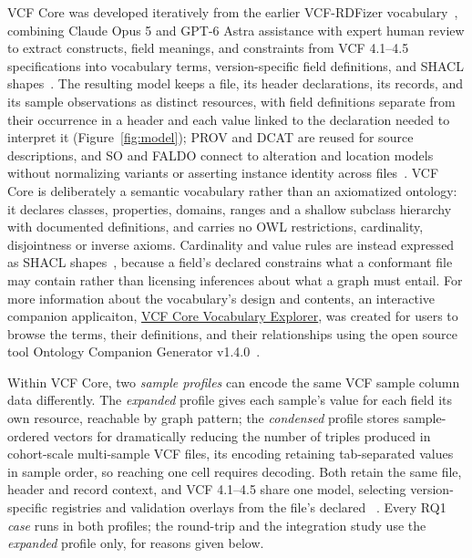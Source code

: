 VCF Core was developed iteratively from the earlier VCF-RDFizer vocabulary~\cite{crum2025semantifying}, combining Claude Opus 5 and GPT-6 Astra assistance with expert human review to extract constructs, field meanings, and constraints from VCF 4.1--4.5 specifications into vocabulary terms, version-specific field definitions, and SHACL shapes~\cite{htsspecs,vcf45}.
The resulting model keeps a file, its header declarations, its records, and its sample observations as distinct resources, with field definitions separate from their occurrence in a header and each value linked to the declaration needed to interpret it (Figure~\ref{fig:model}); PROV and DCAT are reused for source descriptions, and SO and FALDO connect to alteration and location models without normalizing variants or asserting instance identity across files~\cite{prov2013,eilbeck2005so,bolleman2016faldo,vcfc210}.
VCF Core is deliberately a semantic vocabulary rather than an axiomatized ontology: it declares classes, properties, domains, ranges and a shallow subclass hierarchy with documented definitions, and carries no OWL restrictions, cardinality, disjointness or inverse axioms.
Cardinality and value rules are instead expressed as SHACL shapes~\cite{shacl2017}, because a field's declared  constrains what a conformant file may contain rather than licensing inferences about what a graph must entail.
For more information about the vocabulary's design and contents, an interactive companion applicaiton, \href{https://ecrum19.github.io/vcf-core-vocabulary/}{VCF Core Vocabulary Explorer}, was created for users to browse the terms, their definitions, and their relationships using the open source tool Ontology Companion Generator v1.4.0~\cite{ocg2026}.

Within VCF Core, two \emph{sample profiles} can encode the same VCF sample column data differently.
The \textit{expanded} profile gives each sample's value for each field its own resource, reachable by graph pattern; the \textit{condensed} profile stores sample-ordered vectors for dramatically reducing the number of triples produced in cohort-scale multi-sample VCF files, its  encoding retaining tab-separated values in sample order, so reaching one cell requires decoding.
Both retain the same file, header and record context, and VCF 4.1--4.5 share one model, selecting version-specific registries and validation overlays from the file's declared ~\cite{htsspecs,vcf45,vcfc210}.
Every RQ1 \emph{case} runs in both profiles; the round-trip and the integration study use the \textit{expanded} profile only, for reasons given below.

